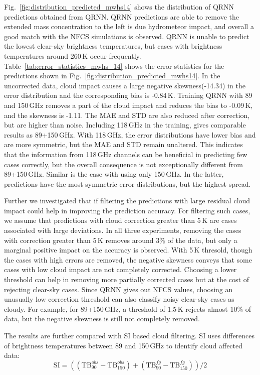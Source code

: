 \documentclass[amt, manuscript]{copernicus}
\begin{document}
Fig.~\ref{fig:distribution_predicted_mwhs14} shows the distribution of QRNN predictions obtained from QRNN. QRNN predictions are able to remove the extended mass concentration to the left is due hydrometeor impact, and overall a good match with the NFCS simulations is observed. QRNN is unable to predict the lowest clear-sky brightness temperatures, but cases with brightness temperatures around 260\,K occur frequently.  Table~\ref{tab:error_statistics_mwhs_14} shows the error statistics for the predictions shown in Fig.~\ref{fig:distribution_predicted_mwhs14}. In the uncorrected data, cloud impact causes a large negative skewness(-14.34) in the error distribution and the corresponding bias is -0.84\,K. Training QRNN with 89 and 150\,GHz removes a part of the cloud impact and reduces the bias to -0.09\,K, and the skewness is -1.11. The MAE and STD are also reduced after correction, but are higher than noise. Including 118\,GHz in the training, gives comparable results as 89+150\,GHz. With 118\,GHz, the error distributions have lower bias and are more symmetric, but the MAE and STD remain unaltered. This indicates that the information from 118\,GHz channels can be beneficial in predicting few cases correctly, but the overall consequence is not exceptionally different from 89+150\,GHz. Similar is the case with using only 150\,GHz. In the latter, predictions have the most symmetric  error distributions, but the highest spread. 

Further we investigated that if filtering the predictions with large residual cloud impact could help in improving the prediction accuracy. For filtering such cases, we assume that predictions with cloud correction greater than 5\,K are cases associated with large deviations. In all three experiments, removing the cases with correction greater than 5\,K removes around 3\% of the data, but only a marginal positive impact on the accuracy is observed. With 5\,K thresold, though the cases with high errors are removed, the negative skewness conveys that some cases with low cloud impact are not completely corrected. Choosing a lower threshold can help in removing more partially corrected cases but at the cost of rejecting clear-sky cases. Since QRNN gives out NFCS values, choosing an unusually low correction threshold can also classify noisy clear-sky cases as cloudy. For example, for 89+150\,GHz, a threshold of 1.5\,K rejects almost 10\% of data, but the negative skewness is still not completely removed. 

The results are further compared with SI based cloud filtering. SI uses differences of brightness temperatures between 89 and 150\,GHz to identify cloud affected data:
\begin{equation}
\text{SI} = ((\text{TB}^{obs}_{90} - \text{TB}^{obs}_{150}) + (\text{TB}^{fg}_{90} - \text{TB}^{fg}_{150}))/2 
\end{equation}
\end{document}
